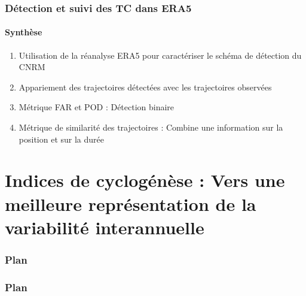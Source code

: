 \documentclass[aspectratio=169, usepdftitle=false, xcolor={dvipsnames}, 9pt,table]{beamer}
\begin{document}
\begin{frame}
    \frametitle{Détection et suivi des TC dans ERA5}
    \framesubtitle{Synthèse}
    \begin{block}
        \small
        \begin{enumerate}
            \setlength\itemsep{1em}
            \item<1-> Utilisation de la réanalyse ERA5 pour caractériser le schéma de détection du CNRM
            \item<2-> Appariement des trajectoires détectées avec les trajectoires observées
            \item<3-> Métrique FAR et POD : Détection binaire
            \item<4-> Métrique de similarité des trajectoires : Combine une information sur la position et sur la durée
        \end{enumerate}
    \end{block}
\end{frame}

\section[Indices de cyclogénèse]{Indices de cyclogénèse : Vers une meilleure représentation de la variabilité interannuelle}
\begin{frame}[c]
    \frametitle{Plan}
    \addtocounter{framesinsection}{-1}
    \tableofcontents[currentsection,hideallsubsections,sections={1-3}]
    \vspace{-3em}
    \tableofcontents[hideallsubsections,sections={4-}]
\end{frame}
%
\begin{frame}[c]
    \frametitle{Plan}
    \addtocounter{framesinsection}{-1}
\end{frame}


\end{document}
